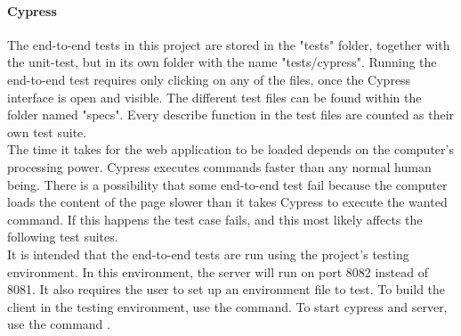 \paragraph{Cypress}
The end-to-end tests in this project are stored in the "tests" folder, together with the unit-test, but in its own folder with the name "tests/cypress". Running the end-to-end test requires only clicking on any of the files, once the Cypress interface is open and visible. The different test files can be found within the folder named "specs". Every describe function in the test files are counted as their own test suite. 
\\[11pt]
The time it takes for the web application to be loaded depends on the computer's processing power. Cypress executes commands faster than any normal human being. There is a possibility that some end-to-end test fail because the computer loads the content of the page slower than it takes Cypress to execute the wanted command. If this happens the test case fails, and this most likely affects the following test suites. 
\\[11pt]
It is intended that the end-to-end tests are run using the project's testing environment. In this environment, the server will run on port 8082 instead of 8081. It also requires the user to set up an environment file to test. To build the client in the testing environment, use the  command. To start cypress and server, use the command .
